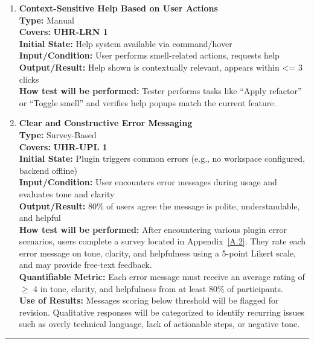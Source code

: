 \documentclass[12pt, titlepage]{article}
\newcommand{\colorrule}{\textcolor{BlueViolet}{\rule{\linewidth}{2pt}}}
\begin{document}
\begin{enumerate}[label={\bf \textcolor{Maroon}{test-UH-\arabic*}}, wide=0pt, font=\itshape]
  \item \textbf{Context-Sensitive Help Based on User Actions} \\[2mm]
    \textbf{Type:} Manual \\
    \textbf{Covers:} \textbf{UHR-LRN 1} \\ 
    \textbf{Initial State:} Help system available via command/hover \\
    \textbf{Input/Condition:} User performs smell-related actions, requests help \\
    \textbf{Output/Result:} Help shown is contextually relevant, appears within \textless= 3 clicks \\[2mm]
    \textbf{How test will be performed:} Tester performs tasks like “Apply refactor” or “Toggle smell” and verifies help popups match the current feature.

    \item \textbf{Clear and Constructive Error Messaging} \\[2mm]
    \textbf{Type:} Survey-Based \\
    \textbf{Covers:} \textbf{UHR-UPL 1} \\ 
    \textbf{Initial State:} Plugin triggers common errors (e.g., no workspace configured, backend offline) \\
    \textbf{Input/Condition:} User encounters error messages during usage and evaluates tone and clarity \\
    \textbf{Output/Result:} 80\% of users agree the message is polite, understandable, and helpful \\[2mm]
    \textbf{How test will be performed:} After encountering various plugin error scenarios, users complete a survey located in Appendix~\ref{A.2}. They rate each error message on tone, clarity, and helpfulness using a 5-point Likert scale, and may provide free-text feedback. \\
    \textbf{Quantifiable Metric:} Each error message must receive an average rating of $\geq$ 4 in tone, clarity, and helpfulness from at least 80\% of participants. \\
    \textbf{Use of Results:} Messages scoring below threshold will be flagged for revision. Qualitative responses will be categorized to identify recurring issues such as overly technical language, lack of actionable steps, or negative tone.

\end{enumerate}


\newpage
  \noindent
  \textcolor{Blue}{\colorrule}
\end{document}
